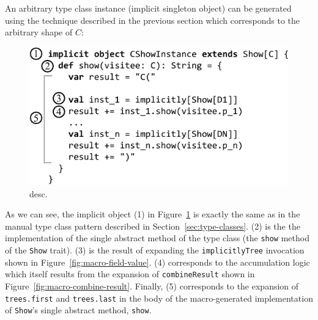\documentclass[preprint,nocopyrightspace]{sigplanconf}
\begin{document}
An arbitrary type class instance (implicit singleton object) can be generated
using the technique described in the previous section which corresponds to the
arbitrary shape of $C$:

\begin{figure}[h!]
\centering
\includegraphics[width=0.87\columnwidth]{basic-generation.pdf}
\caption{desc.}
\label{fig:basic-generation}
\end{figure}

As we can see, the implicit object (1) in Figure~\ref{fig:basic-generation} is
exactly the same as in the manual type class pattern described in
Section~\ref{sec:type-classes}. (2) is the the implementation of the single
abstract method of the type class (the \verb|show| method of the \verb|Show|
trait). (3) is the result of expanding the \verb|implicitlyTree| invocation
shown in Figure~\ref{fig:macro-field-value}. (4) corresponds to the
accumulation logic which itself results from the expansion of
\verb|combineResult| shown in Figure~\ref{fig:macro-combine-result}. Finally,
(5) corresponds to the expansion of \verb|trees.first| and \verb|trees.last|
in the body of the macro-generated implementation of \verb|Show|'s single
abstract method, \verb|show|.






\end{document}
